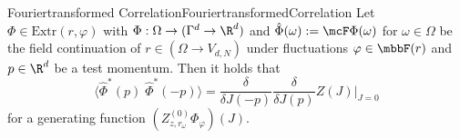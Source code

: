 \begin{mpos}{Fouriertransformed Correlation}{FouriertransformedCorrelation}
    Let $\Phi\in\text{Extr}(r,\varphi)$ with $\Phi:\Omega\to(\Gamma^d\to\R^d)$ and $\hat\Phi(\omega):=\mcF\Phi(\omega)$ for $\omega\in\Omega$ be the field continuation of $r\in(\Omega\to V_{d,N})$ under fluctuations $\varphi\in\mbbF(r)$ and $p\in\R^d$ be a test momentum. Then it holds that
    \[
        \langle \hat\Phi^*(p)\;\hat\Phi^*(-p)\rangle = \frac{\delta}{\delta J(-p)}\frac{\delta}{\delta J(p)}Z(J)\Big|_{J=0}
    \]
    for a generating function $(Z_{z,r_\omega}^{(0)}\Phi_\varphi)(J)$.
\end{mpos}